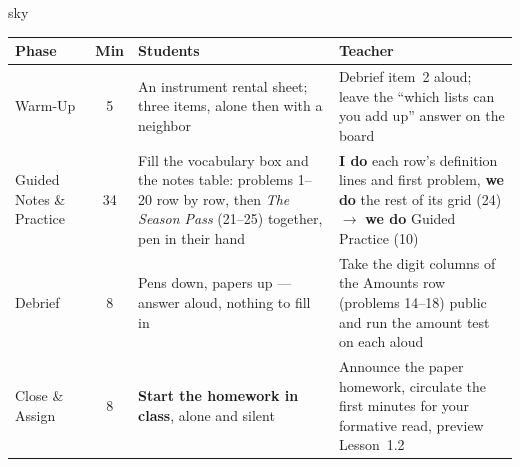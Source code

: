 \documentclass[10pt]{article}
\begin{document}
\boxguard[30]
\begin{skillbox}{sky}
\renewcommand{\arraystretch}{1.25}
\begin{tabularx}{\linewidth}{@{}l c X X@{}}
\textbf{Phase} & \textbf{Min} & \textbf{Students} & \textbf{Teacher} \\
\hline
Warm-Up & 5 & An instrument rental sheet; three items, alone then with a neighbor & Debrief item~2 aloud; leave the ``which lists can you add up'' answer on the board \\
Guided Notes \& Practice & 34 & Fill the vocabulary box and the notes table: problems 1--20 row by row, then \emph{The Season Pass} (21--25) together, pen in their hand & \textbf{I do} each row's definition lines and first problem, \textbf{we do} the rest of its grid (24) $\to$ \textbf{we do} Guided Practice (10) \\
Debrief & 8 & Pens down, papers up --- answer aloud, nothing to fill in & Take the digit columns of the Amounts row (problems 14--18) public and run the amount test on each aloud \\
Close \& Assign & 8 & \textbf{Start the homework in class}, alone and silent & Announce the paper homework, circulate the first minutes for your formative read, preview Lesson~1.2 \\
\end{tabularx}
\end{skillbox}
\end{document}
